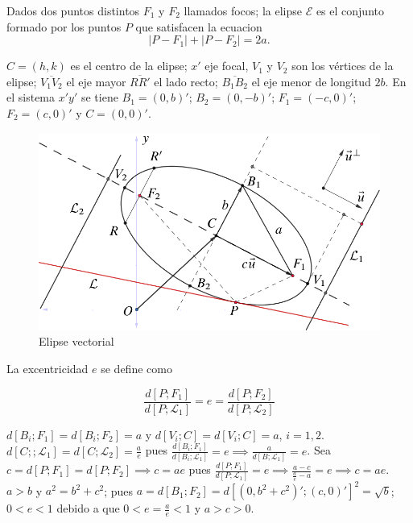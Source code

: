 \documentclass[12pt,]{report}
\theoremstyle{definition}
\theoremstyle{definition}
\theoremstyle{definition}
\theoremstyle{remark}
\begin{document}
Dados dos puntos distintos \(F_1\) y \(F_2\) llamados focos; la elipse \(\mathcal{E}\) es el conjunto formado por los puntos \(P\) que satisfacen la ecuacion \[\left|P-F_1\right|+\left|P-F_2\right|=2a.\]

\(C=(h,k)\) es el centro de la elipse; \(x'\) eje focal, \(V_1\) y \(V_2\) son los vértices de la elipse; \(\overline{V_1V_2}\) el eje mayor \(\overline{RR'}\) el lado recto; \(\overline{B_1B_2}\) el eje menor de longitud \(2b\). En el sistema \(x'y'\) se tiene \(B_1=(0,b)'\); \(B_2=(0,-b)'\); \(F_1=(-c,0)'\); \(F_2=(c,0)'\) y \(C=(0,0)'\).

\begin{figure}

{\centering \includegraphics{elipse} 

}

\caption{Elipse vectorial}\label{fig:pressure1}
\end{figure}

La excentricidad \(e\) se define como

\[\frac{d\left[P;F_1\right]}{d\left[P;\mathcal{L}_1\right]}=e=\frac{d\left[P;F_2\right]}{d\left[P;\mathcal{L}_2\right]}\]

\(d\left[B_i;F_1\right]=d\left[B_i;F_2\right]= a\) y \(d\left[V_i;C\right]=d\left[V_i;C\right]=a\), \(i=1,2\). \(d\left[C;;\mathcal{L}_1\right]=d\left[C;\mathcal{L}_2\right]=\frac{a}{e}\) pues \(\frac{d\left[B_i;F_1\right]}{d\left[B_i;\mathcal{L}_1\right]}=e\implies \frac{a}{d\left[B;\mathcal{L}_1\right]}=e\). Sea \(c=d\left[P;F_1\right]=d\left[P;F_2\right]\implies c=ae\) pues \(\frac{d\left[P;F_1\right]}{d\left[P;\mathcal{L}_1\right]}=e\implies \frac{a-c}{\frac{a}{e}-a}=e \implies c=ae\). \(a>b\) y \(a^2=b^2+c^2\); pues \(a=d\left[B_1;F_2\right]=d\left[(0,b^2+c^2)';(c,0)'\right]^2=\sqrt{b}\); \(0<e<1\) debido a que \(0<e=\frac{a}{e}<1\) y \(a>c>0\).
\end{document}
